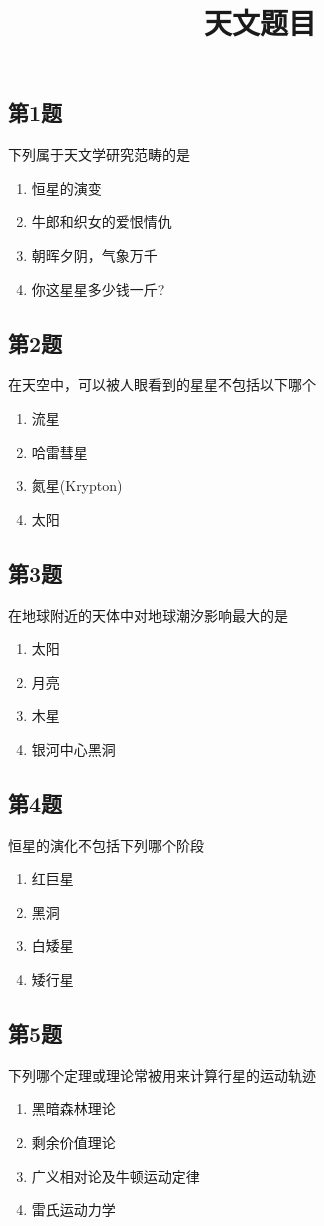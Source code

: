 \documentclass[hyperref,UTF8]{ctexart}
\title{天文题目}
\date{}
\begin{document}
\subsection*{第1题} 
下列属于天文学研究范畴的是 

\begin{enumerate}[\label= A.]
    \item 恒星的演变
    \item 牛郎和织女的爱恨情仇 
    \item 朝晖夕阴，气象万千 
    \item 你这星星多少钱一斤?
\end{enumerate}
\subsection*{第2题} 
在天空中，可以被人眼看到的星星不包括以下哪个 
\begin{enumerate}[\label= A.]
    \item 流星 
    \item 哈雷彗星
    \item 氮星(Krypton)
    \item 太阳
\end{enumerate} 

\subsection*{第3题}
在地球附近的天体中对地球潮汐影响最大的是 
\begin{enumerate}[\label= A.]
    \item 太阳
    \item 月亮
    \item 木星
    \item 银河中心黑洞
\end{enumerate} 

\newpage

\subsection*{第4题} 
恒星的演化不包括下列哪个阶段

\begin{enumerate}[\label= A.]
    \item 红巨星
    \item 黑洞
    \item 白矮星
    \item 矮行星
\end{enumerate}

\subsection*{第5题} 下列哪个定理或理论常被用来计算行星的运动轨迹 \begin{enumerate}[\label= A.]
    \item 黑暗森林理论 \item 剩余价值理论 \item 广义相对论及牛顿运动定律\item 雷氏运动力学
\end{enumerate} 
\end{document}
